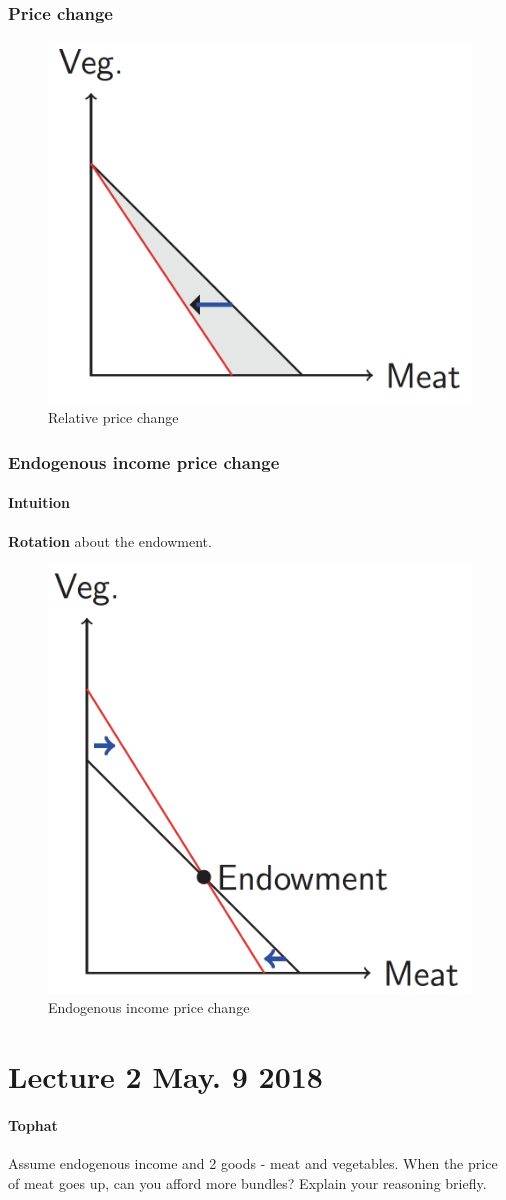 \documentclass{article}
\begin{document}
	\subsubsection{Price change}
	\begin{figure}[h]
		\centering
		\includegraphics[width=0.5\linewidth]{eco206pic/relative_price_change}
		\caption{Relative price change}
	\end{figure}
	
	\subsubsection{Endogenous income price change}
	\paragraph{Intuition} \textbf{Rotation} about the endowment.
	\begin{figure}[h]
		\centering
		\includegraphics[width=0.5\linewidth]{eco206pic/End_price_change}
		\caption{Endogenous income price change}
	\end{figure}
	

\section{Lecture 2 May. 9 2018}
\paragraph{Tophat} Assume endogenous income and 2 goods - meat and vegetables. When the price of meat goes up, can you afford more bundles? Explain your reasoning briefly.
\end{document}
